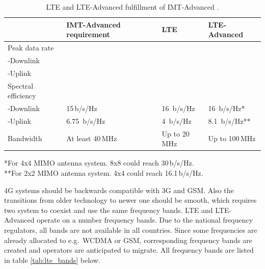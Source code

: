 \begin{table}[H]
    \centering
    \caption{LTE and LTE-Advanced fulfillment of IMT-Advanced \cite{parkvall_lte}.}
    \label{tab:lte}
    \begin{tabular}{|l|M{3cm}|M{3cm}|M{3cm}|}
        \hline
         & IMT-Advanced requirement & LTE & LTE-Advanced \\
        \hline
        Peak data rate & & & \\
        -Downlink & & & \\
        -Uplink  &  & & \\
        \hline
        Spectral efficiency & & & \\
        -Downlink & 15\,b/s/Hz & 16\, b/s/Hz & 16\, b/s/Hz*\\
        -Uplink  & 6.75\, b/s/Hz & 4\, b/s/Hz & 8.1\, b/s/Hz**\\
        \hline
        Bandwidth & At least 40\,MHz & Up to 20\,MHz & Up to 100\,MHz \\
        \hline
    \end{tabular}
    
    *For 4x4 MIMO antenna system. 8x8 could reach 30\,b/s/Hz.\\
    **For 2x2 MIMO antenna system. 4x4 could reach 16.1\,b/s/Hz.
\end{table}

4G systems should be backwards compatible with 3G and GSM. Also the transitions from older technology to newer one should be smooth, which requires two system to coexist and use the same frequency bands. LTE and LTE-Advanced operate on a number frequency bands. Due to the national frequency regulators, all bands are not available in all countries. Since some frequencies are already allocated to e.g.\ WCDMA or GSM, corresponding frequency bands are created and operators are anticipated to migrate. All frequency bands are listed in table \ref{tab:lte_bands} below. \cite{molisch, radio_electronics}

